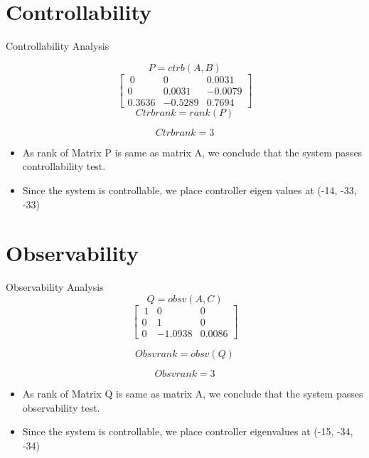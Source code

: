 \documentclass[10pt,compress,mathserif]{beamer}
\begin{document}
\section{Controllability}
\begin{frame}{Controllability Analysis}


\vskip10pt
\begin{equation} P = ctrb(A, B) \end{equation}\vskip10pt
\begin{equation}
\begin{bmatrix}
\
0 & 0 & 0.0031 \\
0 & 0.0031 & -0.0079 \\
0.3636 & -0.5289 & 0.7694  \end{bmatrix}
\end{equation}
\vskip10pt
\begin{equation}
Ctrb rank = rank(P)
\end{equation}

\begin{equation}
 Ctrbrank = 3
\end{equation}
\begin{itemize}
\item As rank of Matrix P is same as matrix A, we conclude that the system passes controllability test. 
\item Since the system is controllable, we place controller eigen values at (-14, -33, -33)
\end{itemize}
 
\vskip10pt
\end{frame}


\section{Observability}
\begin{frame}{Observability Analysis}
\begin{equation} Q = obsv(A, C) \end{equation}
\begin{equation}
\begin{bmatrix}
\
1 & 0 & 0 \\
0 & 1 & 0\\
0 & -1.0938 & 0.0086  \end{bmatrix}
\end{equation}

\begin{equation}
Obsv rank = obsv(Q)
\end{equation}

\begin{equation}
 Obsvrank = 3
\end{equation}
\begin{itemize}
\item As rank of Matrix Q is same as matrix A, we conclude that the system passes observability test. 
\item Since the system is controllable, we place controller eigenvalues at (-15, -34, -34) \end{itemize}
\end{frame}
\end{document}
